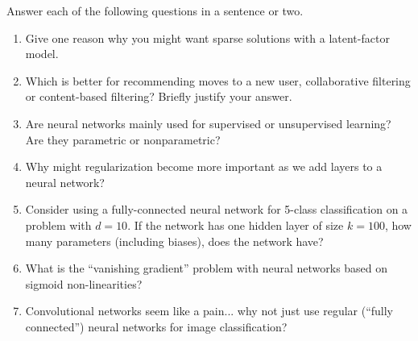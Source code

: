 \documentclass{article}
\newcommand{\blu}[1]{{\textcolor{blu}{#1}}}
\let\ask\blu
\begin{document}
\ask{Answer each of the following questions in a sentence or two.}
\begin{enumerate}

\item Give one reason why you might want sparse solutions with a latent-factor model.


\item Which is better for recommending moves to a new user, collaborative filtering or content-based filtering? Briefly justify your answer.


\item{Are neural networks mainly used for supervised or unsupervised learning? Are they parametric or nonparametric?}

\item{Why might regularization become more important as we add layers to a neural network?}


\item{Consider using a fully-connected neural network for 5-class classification on a problem with $d=10$. If the network has one hidden layer of size $k=100$, how many parameters (including biases), does the network have?}


\item What is the ``vanishing gradient'' problem with neural networks based on sigmoid non-linearities?

\item{Convolutional networks seem like a pain... why not just use regular (``fully connected'') neural networks for image classification?}

\end{enumerate}
\end{document}
